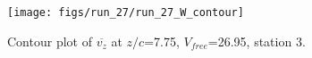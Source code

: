 \begin{figure}[H]
\centering
\texttt{[image: figs/run\_27/run\_27\_W\_contour]}
\caption{Contour plot of $\overline{v_{z}}$ at $z/c$=7.75, $V_{free}$=26.95, station 3.}
\label{fig:run_27_W_contour}
\end{figure}


